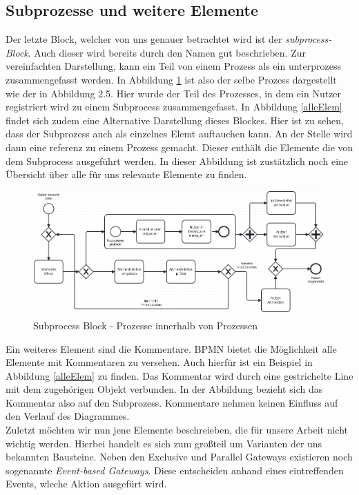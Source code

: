 \subsection{Subprozesse und weitere Elemente}\label{Subprozesse und weitere Elemente}
Der letzte Block, welcher von uns genauer betrachtet wird ist der \textit{subprocess-Block}. Auch dieser wird bereits durch den Namen gut beschrieben. Zur vereinfachten Darstellung, kann ein Teil von einem Prozess als ein unterprozess zusammengefasst werden. In Abbildung \ref{subprozess} ist also der selbe Prozess dargestellt wie der in Abbildung 2.5. Hier wurde der Teil des Prozesses, in dem ein Nutzer registriert wird zu einem Subprocess zusammengefasst. In Abbildung \ref{alleElem} findet sich zudem eine Alternative Darstellung dieses Blockes. Hier ist zu sehen, dass der Subprozess auch als einzelnes Elemt auftauchen kann. An der Stelle wird dann eine referenz zu einem Prozess gemacht. Dieser enthält die Elemente die von dem Subprocess ausgeführt werden. In dieser Abbildung ist zustätzlich noch eine Übersicht über alle für uns relevante Elemente zu finden.\\
\begin{figure}
\centering
\includegraphics[scale=0.5]{Figures/Beispiel7}
\decoRule
\caption[Subprocess Block]{Subprocess Block - Prozesse innerhalb von Prozessen}
\label{subprozess}
\end{figure}Ein weiteres Element sind die Kommentare. BPMN bietet die Möglichkeit alle Elemente mit Kommentaren zu versehen. Auch hierfür ist ein Beispiel in Abbildung \ref{alleElem} zu finden. Das Kommentar wird durch eine gestrichelte Line mit dem zugehörigen Objekt verbunden. In der Abbildung bezieht sich das Kommentar also auf den Subprozess. Kommentare nehmen keinen Einfluss auf den Verlauf des Diagrammes.\\
Zuletzt möchten wir nun jene Elemente beschreieben, die für unsere Arbeit nicht wichtig werden. Hierbei handelt es sich zum großteil um Varianten der uns bekannten Bausteine. Neben den Exclusive und Parallel Gateways existieren noch sogenannte \textit{Event-based Gateways}. Diese entscheiden anhand eines eintreffenden Events, wleche Aktion ausgefürt wird. 
